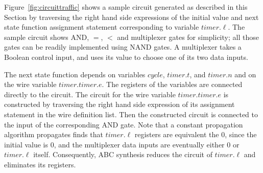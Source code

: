 \begin{example}
Figure~\ref{fig:circuittraffic} shows a sample circuit generated as described in this Section 
by traversing the right hand side expressions of the initial 
value and next state function assignment statement corresponding to variable
$timer.\ell$. 
The sample circuit shows AND, $=$, $<$ and multiplexer gates for simplicity; 
all those gates can be readily implemented using NAND gates. 
A multiplexer takes a Boolean control input, and uses its value to 
choose one of its two data inputs. 

The next state function depends on variables $cycle$, $timer.t$, and $timer.n$ and on 
the wire variable $timer.timer.e$. 
The registers of the variables are connected directly to the circuit. 
The circuit for the wire variable $timer.timer.e$ is constructed by traversing 
the right hand side expression of its 
assignment statement in the wire definition list. 
Then the constructed circuit is connected to the input of the corresponding AND gate. 
Note that a constant propagation algorithm propagates finds that 
$timer.\ell$ registers are equivalent the $0$, since the initial value is $0$, 
and the multiplexer data inputs are eventually either $0$ or $timer.\ell$ itself. 
Consequently, ABC synthesis reduces the circuit of $timer.\ell$ and eliminates its
registers. 

\end{example}